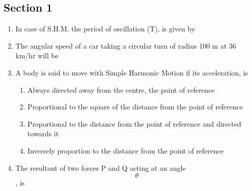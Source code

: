 \documentclass[11pt,a4paper]{article}
\begin{document}
\subsection*{Section 1}
\begin{enumerate}
\item{In case of S.H.M. the period of oscillation (T), is given by}
\\
\item{The angular speed of a car taking a circular turn of radius 100 m at 36 km/hr will be}
\\
\item{A body is said to move with Simple Harmonic Motion if its acceleration, is}
\begin{enumerate}[label=\Alph*.]
\item{Always directed away from the centre, the point of reference}
\item{Proportional to the square of the distance from the point of reference}
\item{Proportional to the distance from the point of reference and directed towards it}
\item{Inversely proportion to the distance from the point of reference}
\end{enumerate}
\item{The resultant of two forces P and Q acting at an angle $$\theta $$, is
}
\\
\end{enumerate}
\end{document}
